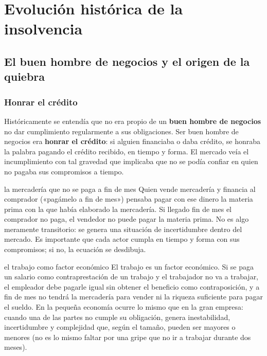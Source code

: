 \documentclass[12pt,oneside]{book}
\begin{document}
\chapter[Evolución histórica]{Evolución histórica de la insolvencia}

\section{El buen hombre de negocios y el origen de la quiebra}

\subsection{Honrar el crédito}

Históricamente se entendía que no era propio de un \textbf{buen hombre de negocios} no dar cumplimiento regularmente a sus obligaciones. Ser buen hombre de negocios era \textbf{honrar el crédito}: si alguien financiaba o daba crédito, se honraba la palabra pagando el crédito recibido, en tiempo y forma. El mercado veía el incumplimiento con tal gravedad que implicaba que no se podía confiar en quien no pagaba sus compromisos a tiempo.

\begin{example}{la mercadería que no se paga a fin de mes}
Quien vende mercadería y financia al comprador («pagámelo a fin de mes») pensaba pagar con ese dinero la materia prima con la que había elaborado la mercadería. Si llegado fin de mes el comprador no paga, el vendedor no puede pagar la materia prima. No es algo meramente transitorio: se genera una situación de incertidumbre dentro del mercado. Es importante que cada actor cumpla en tiempo y forma con sus compromisos; si no, la ecuación se desdibuja.
\end{example}

\begin{example}{el trabajo como factor económico}
El trabajo es un factor económico. Si se paga un salario como contraprestación de un trabajo y el trabajador no va a trabajar, el empleador debe pagarle igual sin obtener el beneficio como contraposición, y a fin de mes no tendrá la mercadería para vender ni la riqueza suficiente para pagar el sueldo. En la pequeña economía ocurre lo mismo que en la gran empresa: cuando una de las partes no cumple su obligación, genera inestabilidad, incertidumbre y complejidad que, según el tamaño, pueden ser mayores o menores (no es lo mismo faltar por una gripe que no ir a trabajar durante dos meses).
\end{example}
\end{document}
